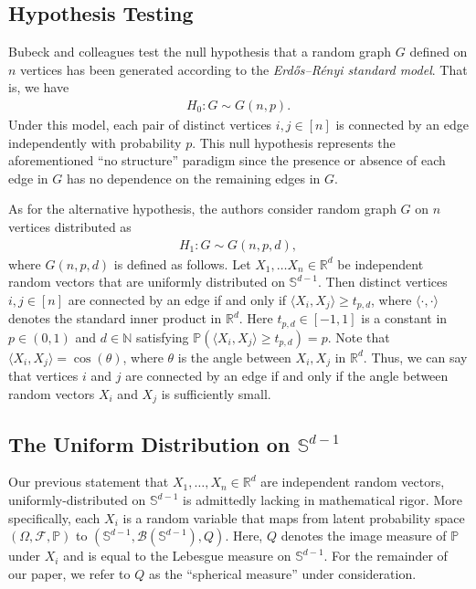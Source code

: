 \documentclass{article}
\begin{document}
\subsection{Hypothesis Testing}
Bubeck and colleagues test the null hypothesis that a random graph $G$ defined on $n$ vertices has been generated according to the \textit{Erdős–Rényi standard model}. That is, we have
\begin{align}
    H_0: G \sim G(n, p).
\end{align}
Under this model, each pair of distinct vertices $i, j \in [n]$ is connected by an edge independently with probability $p$. This null hypothesis represents the aforementioned \enquote{no structure} paradigm since the presence or absence of each edge in $G$ has no dependence on the remaining edges in $G$.

As for the alternative hypothesis, the authors consider random graph $G$ on $n$ vertices distributed as 
\begin{align}
    H_1: G \sim G(n, p, d),
\end{align}
where $G(n, p, d)$ is defined as follows. Let $X_1, \ldots X_n \in \mathbb{R}^d$ be independent random vectors that are uniformly distributed on $\mathbb{S}^{d-1}$. Then distinct vertices $i, j \in [n]$ are connected by an edge if and only if $\langle X_i, X_j \rangle \geq t_{p, d}$, where $\langle \cdot, \cdot \rangle$ denotes the standard inner product in $\mathbb{R}^d$. Here $t_{p,d} \in [-1, 1]$ is a constant in $p \in (0,1)$ and $d \in \mathbb{N}$ satisfying $\mathbb{P}(\langle X_i, X_j \rangle \geq t_{p,d}) = p$. Note that $\langle X_i, X_j \rangle = \cos(\theta)$, where $\theta$ is the angle between $X_i, X_j$ in $\mathbb{R}^d$. Thus, we can say that vertices $i$ and $j$ are connected by an edge if and only if the angle between random vectors $X_i$ and $X_j$ is sufficiently small.

\subsection{The Uniform Distribution on $\mathbb{S}^{d-1}$}
Our previous statement that $X_1, \ldots, X_n \in \mathbb{R}^{d}$ are independent random vectors, uniformly-distributed on $\mathbb{S}^{d-1}$ is admittedly lacking in mathematical rigor. More specifically, each $X_i$ is a random variable that maps from latent probability space $(\Omega, \mathcal{F}, \mathbb{P})$ to $(\mathbb{S}^{d-1}, \mathcal{B}(\mathbb{S}^{d-1}), Q)$. Here, $Q$ denotes the image measure of $\mathbb{P}$ under $X_i$ and is equal to the Lebesgue measure on $\mathbb{S}^{d-1}$. For the remainder of our paper, we refer to $Q$ as the \enquote{spherical measure} under consideration.
\end{document}
